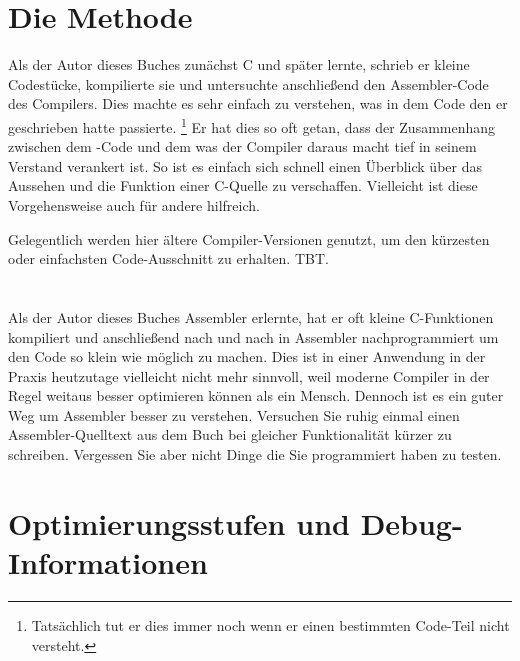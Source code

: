 \section{Die Methode}

Als der Autor dieses Buches zunächst C und später \Cpp lernte, schrieb er kleine Codestücke, kompilierte sie und
untersuchte anschließend den Assembler-Code des Compilers. Dies machte es sehr einfach zu verstehen, was in dem Code
den er geschrieben hatte passierte.
\footnote{Tatsächlich tut er dies immer noch wenn er einen bestimmten Code-Teil nicht versteht.} 
Er hat dies so oft getan, dass der Zusammenhang zwischen dem \CCpp-Code und dem was der Compiler daraus macht tief in
seinem Verstand verankert ist. %
So ist es einfach sich schnell einen Überblick über das Aussehen und die Funktion einer C-Quelle zu verschaffen. 
Vielleicht ist diese Vorgehensweise auch für andere hilfreich.


Gelegentlich werden hier ältere Compiler-Versionen genutzt, um den kürzesten oder einfachsten Code-Ausschnitt zu erhalten.
\ac{TBT}.
\section*{\Exercises}

Als der Autor dieses Buches Assembler erlernte, hat er oft kleine C-Funktionen kompiliert und anschließend nach und nach in
Assembler nachprogrammiert um den Code so klein wie möglich zu machen.
Dies ist in einer Anwendung in der Praxis heutzutage vielleicht nicht mehr sinnvoll, weil moderne Compiler in der Regel weitaus
besser optimieren können als ein Mensch. Dennoch ist es ein guter Weg um Assembler besser zu verstehen. Versuchen Sie ruhig
einmal einen Assembler-Quelltext aus dem Buch bei gleicher Funktionalität kürzer zu schreiben.
Vergessen Sie aber nicht Dinge die Sie programmiert haben zu testen.

\section*{Optimierungsstufen und Debug-Informationen}

